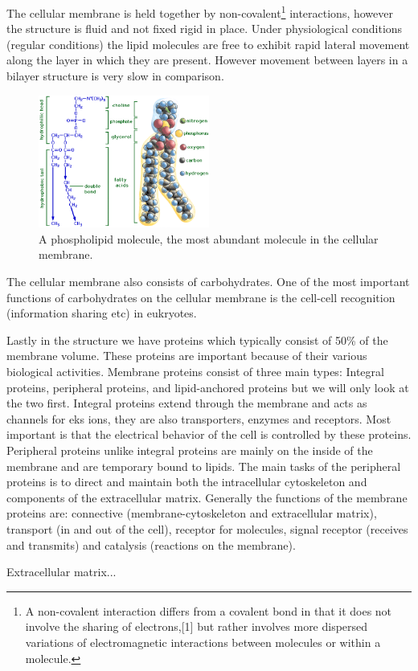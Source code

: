 \documentclass[jmp, amsmath, amssymb, reprint]{article}
\numberwithin{equation}{section}
\begin{document}
\begin{multicols}{2}
The cellular membrane is held together by non-covalent\footnote{A non-covalent interaction differs from a covalent bond in that it does not involve the sharing of electrons,[1] but rather involves more dispersed variations of electromagnetic interactions between molecules or within a molecule.} interactions, however the structure is fluid and not fixed rigid in place. Under physiological conditions (regular conditions) the lipid molecules are free to exhibit rapid lateral movement along the layer in which they are present. However movement between layers in a bilayer structure is very slow in comparison.

\begin{figure}[H]
	\centering
  	\includegraphics[width=0.5\textwidth]{lipid_phos.png}%
	\caption{A phospholipid molecule, the most abundant molecule in the cellular membrane.}
	\label{fig:lipid_phos}
\end{figure}

The cellular membrane also consists of carbohydrates. One of the most important functions of carbohydrates on the cellular membrane is the cell-cell recognition (information sharing etc) in eukryotes.

Lastly in the structure we have proteins which typically consist of 50\% of the membrane volume. These proteins are important because of their various biological activities. Membrane proteins consist of three main types: Integral proteins, peripheral proteins, and lipid-anchored proteins but we will only look at the two first. Integral proteins extend through the membrane and acts as channels for eks ions, they are also transporters, enzymes and receptors. Most important is that the electrical behavior of the cell is controlled by these proteins. Peripheral proteins  unlike integral proteins are mainly on the inside of the membrane and are temporary bound to lipids. The main tasks of the peripheral proteins is to direct and maintain both the intracellular cytoskeleton and components of the extracellular matrix. Generally the functions of the membrane proteins are: connective (membrane-cytoskeleton and extracellular matrix), transport (in and out of the cell), receptor for molecules, signal receptor (receives and transmits) and catalysis (reactions on the membrane).

Extracellular matrix...




\end{multicols}
\end{document}
